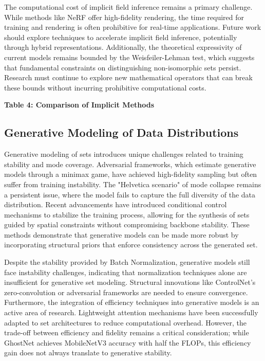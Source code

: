 \documentclass{article}
\begin{document}
The computational cost of implicit field inference remains a primary challenge. While methods like NeRF offer high-fidelity rendering, the time required for training and rendering is often prohibitive for real-time applications. Future work should explore techniques to accelerate implicit field inference, potentially through hybrid representations. Additionally, the theoretical expressivity of current models remains bounded by the Weisfeiler-Lehman test, which suggests that fundamental constraints on distinguishing non-isomorphic sets persist. Research must continue to explore new mathematical operators that can break these bounds without incurring prohibitive computational costs.

\textbf{Table 4: Comparison of Implicit Methods}

\subsection{Generative Modeling of Data Distributions}

\label{sec:generative_modeling_of_data_distribution}

Generative modeling of sets introduces unique challenges related to training stability and mode coverage. Adversarial frameworks, which estimate generative models through a minimax game, have achieved high-fidelity sampling but often suffer from training instability. The "Helvetica scenario" of mode collapse remains a persistent issue, where the model fails to capture the full diversity of the data distribution. Recent advancements have introduced conditional control mechanisms to stabilize the training process, allowing for the synthesis of sets guided by spatial constraints without compromising backbone stability. These methods demonstrate that generative models can be made more robust by incorporating structural priors that enforce consistency across the generated set.

Despite the stability provided by Batch Normalization, generative models still face instability challenges, indicating that normalization techniques alone are insufficient for generative set modeling. Structural innovations like ControlNet's zero-convolution or adversarial frameworks are needed to ensure convergence. Furthermore, the integration of efficiency techniques into generative models is an active area of research. Lightweight attention mechanisms have been successfully adapted to set architectures to reduce computational overhead. However, the trade-off between efficiency and fidelity remains a critical consideration; while GhostNet achieves MobileNetV3 accuracy with half the FLOPs, this efficiency gain does not always translate to generative stability.
\end{document}

